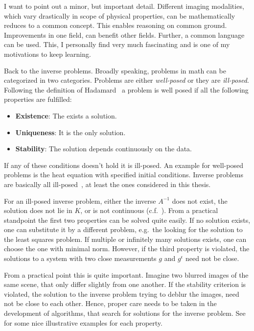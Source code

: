 I want to point out a minor, but important detail. Different imaging modalities, which vary
drastically in scope of physical properties, can be mathematically reduces to a common concept. This
enables reasoning on common ground. Improvements in one field, can benefit other fields. Further, a
common language can be used. This, I personally find very much fascinating and is one of my
motivations to keep learning.

Back to the inverse problems. Broadly speaking, problems in math can be categorized in two
categories. Problems are either \textit{well-posed} or they are \textit{ill-posed}. Following the
definition of Hadamard~\cite{hadamard_sur_1902} a problem is well posed if all the following
properties are fulfilled:

\begin{itemize}
	\item \textbf{Existence}: The exists a solution.
	\item \textbf{Uniqueness}: It is the only solution.
	\item \textbf{Stability}: The solution depends continuously on the data.
\end{itemize}

If any of these conditions doesn't hold it is ill-posed. An example for well-posed problems is the
heat equation with specified initial conditions. Inverse problems are basically all
ill-posed~\cite{hansen_discrete_2010}, at least the ones considered in this thesis.

For an ill-posed inverse problem, either the inverse \(A^{-1}\) does not exist, the solution does
not lie in \(K\), or is not continuous (c.f.~\cite[Chapter~4]{natterer_mathematics_1986}). From a
practical standpoint the first two properties can be solved quite easily. If no solution exists, one
can substitute it by a different problem, e.g.\ the looking for the solution to the least squares
problem. If multiple or infinitely many solutions exists, one can choose the one with minimal norm.
However, if the third property is violated, the solutions to a system with two close measurements
\(g\) and \(g^\epsilon\) need not be close.

From a practical point this is quite important. Imagine two blurred images of the same scene, that
only differ slightly from one another. If the stability criterion is violated, the solution to the
inverse problem trying to deblur the images, need not be close to each other. Hence, proper care
needs to be taken in the development of algorithms, that search for solutions for the inverse
problem. See \citeauthor{hansen_discrete_2010}\cite{hansen_discrete_2010} for some nice illustrative
examples for each property.

